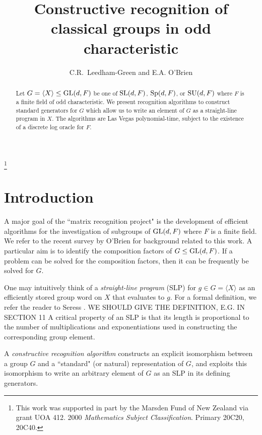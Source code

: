 \documentclass[12pt]{article}
\def\SL{{\rm SL}}
\def\GL{{\rm GL}}
\def\Sp{{\rm Sp}}
\def\SU{{\rm SU}}
\begin{document}
\title{Constructive recognition of classical groups in odd characteristic} 
\author{C.R.\ Leedham-Green and E.A. O'Brien}
\date{}
\maketitle

\begin{abstract}
Let $G = \langle X \rangle \leq \GL(d, F)$ be 
one of $\SL (d, F)$, $\Sp (d, F)$, or $\SU (d, F)$
where $F$ is a finite field of odd characteristic. 
We present recognition algorithms to construct
standard generators for $G$ which allow us
to write an element of $G$ as a straight-line
program in $X$.
The algorithms are Las Vegas polynomial-time, 
subject to the existence of a discrete log oracle for $F$. 
\end{abstract}

\footnote{This work was supported in part by the Marsden Fund of
New Zealand via grant UOA 412.
2000 {\it Mathematics Subject Classification}.
Primary 20C20, 20C40.}

\section{Introduction}
\label{intro}

A major goal of the ``matrix recognition project"
is the development of efficient
algorithms for the investigation of 
subgroups of $\GL(d, F)$ where $F$ 
is a finite field. 
We refer to the recent survey by O'Brien \cite{OBrien05}
for background related to this work.
A particular aim is to 
identify the composition factors
of $G \leq \GL(d, F)$. If a problem
can be solved for the composition factors,
then it can be frequently be solved for $G$.

One may intuitively think of a {\it straight-line program} (SLP)
for $g \in G = \langle X \rangle$ as an efficiently stored group word
on $X$ that evaluates to $g$.  For a formal definition, we
refer the reader to Seress \cite[p.\ 10]{Seress03}.
WE SHOULD GIVE THE DEFINITION, E.G. IN SECTION 11
A critical property of an SLP is 
that its length is proportional to the number of 
multiplications and exponentiations used in
constructing the corresponding group element. 

A {\it constructive recognition algorithm}
constructs an explicit isomorphism
between a group $G$ and a ``standard" (or natural)
representation of $G$, and exploits this isomorphism
to write an arbitrary element of $G$ as
an SLP in its defining generators. 
\end{document}
